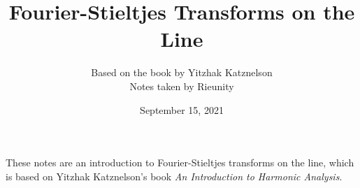 \documentclass[a4paper,12pt]{article}
\begin{document}
\title{Fourier-Stieltjes Transforms on the Line}
\author{{Based on the book by Yitzhak Katznelson}\\
\small Notes taken by Rieunity}
\date{September 15, 2021}  
\maketitle
\thispagestyle{empty}
These notes are an introduction to Fourier-Stieltjes transforms on the line, which is based on Yitzhak Katznelson's book \textit{An Introduction to Harmonic Analysis}.


%
%
\end{document}
